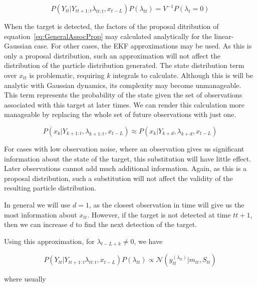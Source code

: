 \begin{equation}
P(Y_{tt}|Y_{tt+1:t} \lambda_{tt:t}, x_{t-L}) P(\lambda_{tt}) = V^{-1} P(\lambda_t=0)
\label{eq:}
\end{equation}

When the target is detected, the factors of the proposal ditribution of equation~\ref{eq:GeneralAssocProp} may calculated analytically for the linear-Gaussian case. For other cases, the EKF approximations may be used. As this is only a proposal distribution, such an approximation will not affect the distribution of the particle distribution generated. The state distribution term over $x_{tt}$ is problematic, requiring $k$ integrals to calculate. Although this is will be analytic with Gaussian dynamics, its complexity may become unmanageable. This term represents the probability of the state given the set of observations associated with this target at later times. We can render this calculation more manageable by replacing the whole set of future observations with just one.

\begin{equation}
P(x_k|Y_{k+1:t}, \lambda_{k+1:t}, x_{t-L}) \approx P(x_k|Y_{k+d}, \lambda_{k+d}, x_{t-L})
\label{eq:}
\end{equation}

For cases with low observation noise, where an observation gives us significant information about the state of the target, this substitution will have little effect. Later observations cannot add much additional information. Again, as this is a proposal distribution, such a substitution will not affect the validity of the resulting particle distribution.

In general we will use $d=1$, as the closest observation in time will give us the most information about $x_{tt}$. However, if the target is not detected at time $tt+1$, then we can increase $d$ to find the next detection of the target.

Using this approximation, for $\lambda_{t-L+k} \ne 0$, we have

\begin{equation}
P(Y_{tt}|Y_{tt+1:t} \lambda_{tt:t}, x_{t-L}) P(\lambda_{tt}) \propto \mathcal{N}(y_{tt}^{(\lambda_{tt})}|m_{tt}, S_{tt})
\end{equation}

where usually

